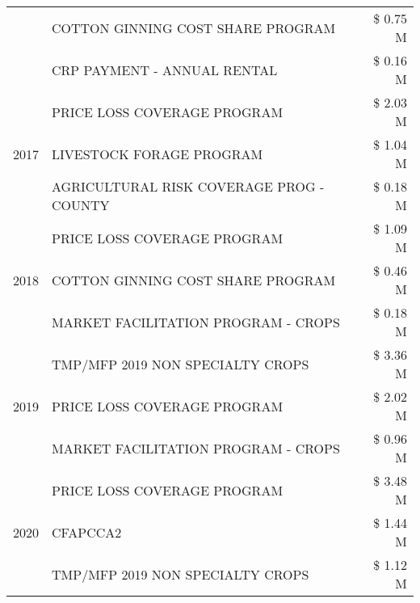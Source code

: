 \begin{tabular}{llr}
 & COTTON GINNING COST SHARE PROGRAM             & \$ 0.75 M \\
 & CRP PAYMENT - ANNUAL RENTAL                   & \$ 0.16 M \\
\cline{1-3}
\multirow[t]{3}{*}{2017} & PRICE LOSS COVERAGE PROGRAM & \$ 2.03 M \\
 & LIVESTOCK FORAGE PROGRAM & \$ 1.04 M \\
 & AGRICULTURAL RISK COVERAGE PROG - COUNTY & \$ 0.18 M \\
\cline{1-3}
\multirow[t]{3}{*}{2018} & PRICE LOSS COVERAGE PROGRAM & \$ 1.09 M \\
 & COTTON GINNING COST SHARE PROGRAM & \$ 0.46 M \\
 & MARKET FACILITATION PROGRAM - CROPS & \$ 0.18 M \\
\cline{1-3}
\multirow[t]{3}{*}{2019} & TMP/MFP 2019 NON SPECIALTY CROPS & \$ 3.36 M \\
 & PRICE LOSS COVERAGE PROGRAM & \$ 2.02 M \\
 & MARKET FACILITATION PROGRAM - CROPS & \$ 0.96 M \\
\cline{1-3}
\multirow[t]{3}{*}{2020} & PRICE LOSS COVERAGE PROGRAM & \$ 3.48 M \\
 & CFAPCCA2 & \$ 1.44 M \\
 & TMP/MFP 2019 NON SPECIALTY CROPS & \$ 1.12 M \\
\cline{1-3}
\bottomrule
\end{tabular}
